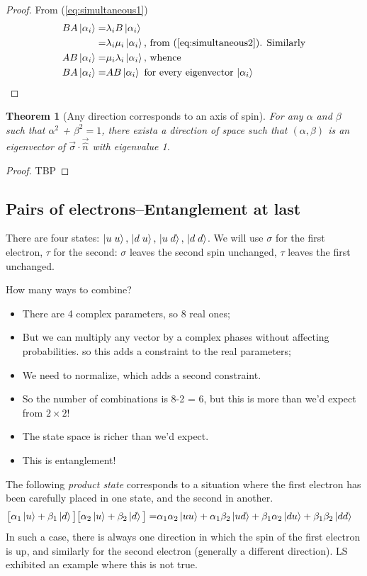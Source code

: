 \documentclass[]{article}
\newtheorem{thm}{Theorem}
\begin{document}
\begin{proof}
	From (\ref{eq:simultaneous1})
	\begin{align*}
		B A\ket{\alpha_i} =& \lambda_i B \ket{\alpha_i}\\
		=& \lambda_i \mu_i \ket{\alpha_i} \text{, from (\ref{eq:simultaneous2})} \text{. Similarly}\\
		A  B \ket{\alpha_i} =& \mu_i  \lambda_i \ket{\alpha_i} \text{, whence}\\
		B A\ket{\alpha_i} =& A  B \ket{\alpha_i} \text{ for every eigenvector $\ket{\alpha_i}$}
	\end{align*}
\end{proof}
\begin{thm}[Any direction corresponds to an axis of spin]
	For any $\alpha$ and $\beta$ such that $\alpha^2$ + $\beta^2=1$, there exista a direction of space such that $(\alpha, \beta)$ is an eigenvector of $\vec{\sigma} \cdot\vec{\hat{n}}$ with eigenvalue 1.
\end{thm}
\begin{proof}
	TBP
\end{proof}
\subsection{Pairs of electrons--Entanglement at last}
There are four states: $\ket{u\;u}, \,\ket{d\;u}, \,\ket{u\;d}, \,\ket{d\;d}$.  We will use $\sigma$ for the first electron, $\tau$ for the second:  $\sigma$ leaves the second spin unchanged, $\tau$ leaves the first unchanged.

How many ways to combine? 
\begin{itemize}
	\item There are 4 complex parameters, so 8 real ones;
	\item But we can multiply any vector by a complex phases without affecting probabilities. so this adds a constraint to the real parameters;
	\item We need to normalize, which adds a second constraint.
	\item So the number of combinations is 8-2 = 6, but this is more than we'd expect from $2\times2$!
	\item The state space is richer than we'd expect. 
	\item This is entanglement!
\end{itemize}


The following \emph{product state} corresponds to a situation where the first electron has been carefully placed in one state, and the second in another.
\begin{align*}
	\big[\alpha_1\ket{u} + \beta_1\ket{d}\big]\big[\alpha_2\ket{u} + \beta_2\ket{d}\big] =& \alpha_1 \alpha_2 \ket{uu} + \alpha_1 \beta_2 \ket{ud} + \beta_1 \alpha_2 \ket{du} + \beta_1 \beta_2 \ket{dd}
\end{align*}
In such a case, there is always one direction in which the spin of the first electron is up, and similarly for the second electron (generally a different direction). LS exhibited an example where this is not true.
\end{document}
